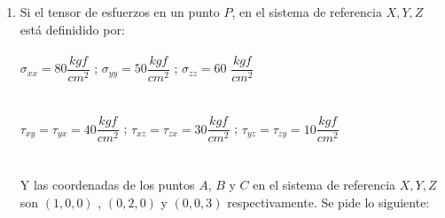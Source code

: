 \documentclass[../notas medios.tex]{subfiles}
\begin{document}
\begin{enumerate}
\item \label{punto18} Si el tensor de esfuerzos en un punto $P$, en el sistema
de referencia $X,Y,Z$ est\'a definidido por:\\\\
\hspace*{10mm} $ \sigma_{xx} = 80\dfrac{kgf}{cm^2}$ \hspace*{5mm} ;   \hspace*{5mm} $\sigma_{yy} = 50\dfrac{kgf}{cm^2}$\hspace*{5mm} ;\hspace*{5mm} $\sigma_{zz} = 60$ $\dfrac{kgf}{cm^2}$\\\\
\\
	\hspace*{10mm}  $ \tau_{xy} = \tau_{yx} =40\dfrac{kgf}{cm^2}$ \hspace*{5mm}; \hspace*{5mm}$\tau_{xz} = \tau_{zx} =30\dfrac{kgf}{cm^2}$\hspace*{5mm} ;\hspace*{5mm} $\tau_{yz} = \tau_{zy} = 10 \dfrac{kgf}{cm^2}$\\\\	
\\	
Y las coordenadas de los puntos $A$, $B$ y $C$  en el sistema de referencia $X,Y,Z$  son   $(1,0,0)$ , $(0,2,0)$ y $(0,0,3)$  respectivamente. Se pide lo siguiente:


\end{enumerate}
\end{document}
